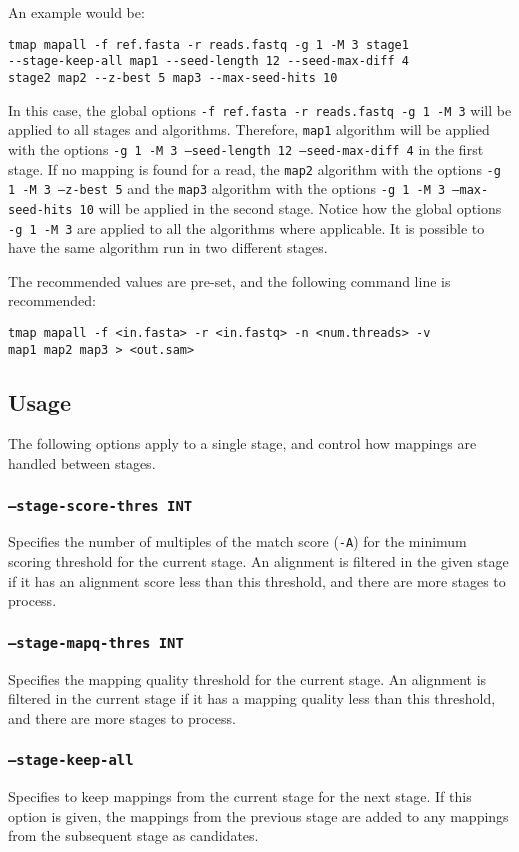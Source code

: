 \documentclass[a4paper,12pt]{book}
\newcommand{\TT}[1]{{\tt #1}} %
\begin{document}
An example would be:
\begin{verbatim}
tmap mapall -f ref.fasta -r reads.fastq -g 1 -M 3 stage1 
--stage-keep-all map1 --seed-length 12 --seed-max-diff 4 
stage2 map2 --z-best 5 map3 --max-seed-hits 10
\end{verbatim}
In this case, the global options \TT{-f ref.fasta -r reads.fastq -g 1 -M 3} will be applied to all stages and algorithms. 
Therefore, \TT{map1} algorithm will be applied with the options \TT{-g 1 -M 3 --seed-length 12 --seed-max-diff 4} in the first stage.
If no mapping is found for a read, the \TT{map2} algorithm with the options \TT{-g 1 -M 3 --z-best 5} and the \TT{map3} algorithm with the options \TT{-g 1 -M 3 --max-seed-hits 10} will be applied in the second stage.
Notice how the global options \TT{-g 1 -M 3} are applied to all the algorithms where applicable.
It is possible to have the same algorithm run in two different stages.

The recommended values are pre-set, and the following command line is recommended:
\begin{verbatim}
tmap mapall -f <in.fasta> -r <in.fastq> -n <num.threads> -v 
map1 map2 map3 > <out.sam>
\end{verbatim}

\subsection{Usage}
The following options apply to a single stage, and control how mappings are handled between stages.
\subsubsection{\TT{--stage-score-thres INT}}
Specifies the number of multiples of the match score (\TT{-A}) for the minimum scoring threshold for the current  stage.
An alignment is filtered in the given stage if it has an alignment score less than this threshold, and there are more stages to process.
\subsubsection{\TT{--stage-mapq-thres INT}}
Specifies the mapping quality threshold for the current stage.
An alignment is filtered in the current stage if it has a mapping quality less than this threshold, and there are more stages to process.
\subsubsection{\TT{--stage-keep-all}}
Specifies to keep mappings from the current stage for the next stage.
If this option is given, the mappings from the previous stage are added to any mappings from the subsequent stage as candidates.
\end{document}
